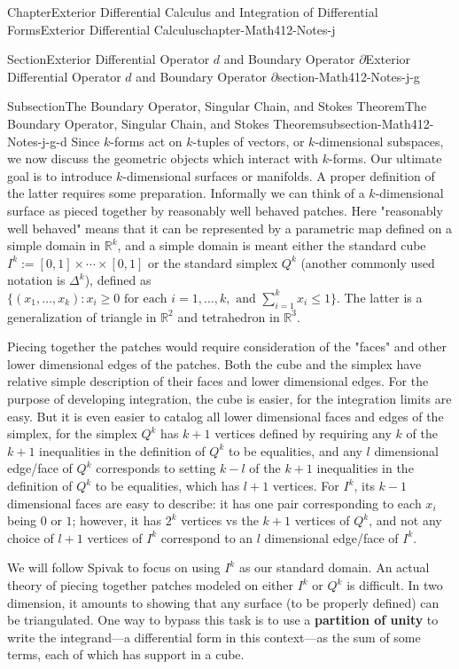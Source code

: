 \documentclass[oneside,10pt,]{book}
\newcommand{\terminology}[1]{\textbf{#1}}
\numberwithin{equation}{section}
\newcommand{\bbR}{\mathbb{R}}
\begin{document}
\begin{chapterptx}{Chapter}{Exterior Differential Calculus and Integration of Differential Forms}{}{Exterior Differential Calculus}{}{}{chapter-Math412-Notes-j}
\begin{sectionptx}{Section}{Exterior Differential Operator \(d\) and Boundary Operator \(\partial\)}{}{Exterior Differential Operator \(d\) and Boundary Operator \(\partial\)}{}{}{section-Math412-Notes-j-g}
\begin{subsectionptx}{Subsection}{The Boundary Operator, Singular Chain, and Stokes Theorem}{}{The Boundary Operator, Singular Chain, and Stokes Theorem}{}{}{subsection-Math412-Notes-j-g-d}
Since \(k\)-forms act on \(k\)-tuples of vectors, or \(k\)-dimensional subspaces, we now discuss the geometric objects which interact with \(k\)-forms. Our ultimate goal is to introduce \(k\)-dimensional surfaces or manifolds. A proper definition of the latter requires some preparation. Informally we can think of a \(k\)-dimensional surface as pieced together by reasonably well behaved patches. Here "reasonably well behaved" means that it can be represented by a parametric map defined on a simple domain in \(\bbR^{k}\), and a simple domain is meant either the standard cube \(I^{k}:=[0,1]\times\cdots\times[0, 1]\) or the standard simplex \(Q^{k}\) (another commonly used notation is \(\Delta^{k}\)), defined as \(\{(x_{1},\ldots, x_{k}): x_{i}\ge 0 \text{ for each } i=1,\ldots, k, \text{ and } \sum_{i=1}^{k}x_{i}\le 1\}\). The latter is a generalization of triangle in \(\bbR^{2}\) and tetrahedron in \(\bbR^{3}\).%
\par
Piecing together the patches would require consideration of the "faces" and other lower dimensional edges of the patches. Both the cube and the simplex have relative simple description of their faces and lower dimensional edges. For the purpose of developing integration, the cube is easier, for the integration limits are easy. But it is even easier to catalog all lower dimensional faces and edges of the simplex, for the simplex \(Q^{k}\) has \(k+1\) vertices defined by requiring any  \(k\) of the  \(k+1\) inequalities in the definition of \(Q^{k}\) to be equalities, and any  \(l\) dimensional edge\slash{}face of \(Q^{k}\) corresponds	to setting \(k-l\) of the  \(k+1\) inequalities in the definition of \(Q^{k}\) to be equalities, which has \(l+1\) vertices. For \(I^{k}\), its \(k-1\) dimensional faces are easy to describe: it has one pair corresponding to each \(x_{i}\) being \(0\) or \(1\); however, it has \(2^{k}\) vertices vs the \(k+1\) vertices of  \(Q^{k}\), and not any choice of \(l+1\) vertices of \(I^{k}\) correspond to an  \(l\) dimensional edge\slash{}face of \(I^{k}\).%
\par
We will follow Spivak to focus on using \(I^{k}\) as our standard domain. An actual theory of piecing together patches modeled on either \(I^{k}\) or \(Q^{k}\) is difficult. In two dimension, it amounts to showing that any surface (to be properly defined) can be triangulated. One way to bypass this task is to use a \terminology{partition of unity} to write the integrand\(\mbox{---}\)a differential form in this context\(\mbox{---}\)as the sum of some terms, each of which has support in a cube.%

\end{subsectionptx}
\end{sectionptx}
\end{chapterptx}
\end{document}
